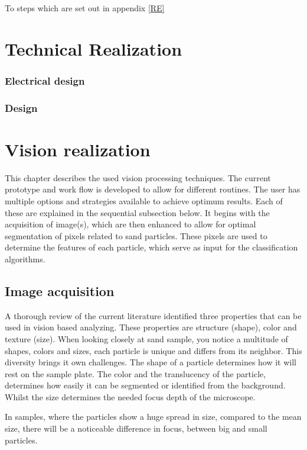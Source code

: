 \documentclass[11pt,fleqn,,a4paper,twoside,openright]{book}
\begin{document}
To steps which are set out in appendix \ref{RE}

\chapter{Technical Realization}

\subsection{Electrical design}

\subsection{Design}

\chapter{Vision realization}
This chapter describes the used vision processing techniques. The current prototype and work flow is developed to allow for different routines. The user has multiple options and strategies available to achieve optimum results. Each of these are explained in the sequential subsection below. It begins with the acquisition of image(s), which are then enhanced to allow for optimal segmentation of pixels related to sand particles. These pixels are used to determine the features of each particle, which serve as input for the classification algorithms.

\section{Image acquisition}
A thorough review of the current literature \cite{Spijker14a} identified three properties that can be used in vision based analyzing. These properties are structure  (shape), color and texture  (size). When looking closely at sand sample, you notice a multitude of shapes, colors and sizes, each particle is unique and differs from its neighbor. This diversity brings it own challenges. The shape of a particle determines how it will rest on the sample plate. The color and the translucency of the particle, determines how easily it can be segmented or identified from the background. Whilst the size determines the needed focus depth of the microscope. 
\begin{remark}
	In samples, where the particles show a huge spread in size, compared to the mean size, there will be a noticeable difference in focus, between big and small particles. 
\end{remark}
\end{document}
